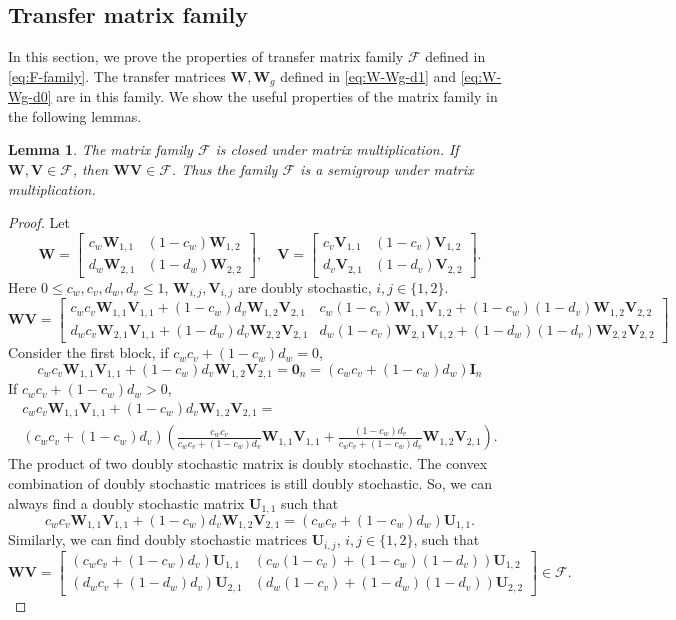 \documentclass{article}
\newcommand{\vzero}{\mathbf{0}}
\newcommand{\vI}{\mathbf{I}}
\newcommand{\vU}{\mathbf{U}}
\newcommand{\vV}{\mathbf{V}}
\newcommand{\vW}{\mathbf{W}}
\theoremstyle{plain}
\newtheorem{lemma}[theorem]{Lemma}
\theoremstyle{definition}
\begin{document}
\subsection{Transfer matrix family}
\label{append:trans-matrix-family}
In this section, we prove the properties of transfer matrix family $\mathscr{F}$ defined in \eqref{eq:F-family}.
The transfer matrices $\vW, \vW_g$ defined in \eqref{eq:W-Wg-d1} and \eqref{eq:W-Wg-d0} are in this family.
We show the useful properties of the matrix family in the following lemmas.
\begin{lemma}
\label{lem:F-semigroup}
The matrix family $\mathscr{F}$ is closed under matrix multiplication. If $\vW,\vV\in\mathscr{F}$, then $\vW\vV\in\mathscr{F}$. Thus the family $\mathscr{F}$ is a semigroup under matrix multiplication.
\end{lemma}
\begin{proof}
Let
$$
\vW=\left[
\begin{array}{cc}
    c_w \vW_{1,1} & (1-c_w)\vW_{1,2} \\
    d_w\vW_{2,1} & (1-d_w)\vW_{2,2} 
\end{array}
\right],\quad
\vV=\left[
\begin{array}{cc}
    c_v \vV_{1,1} & (1-c_v)\vV_{1,2} \\
    d_v\vV_{2,1} & (1-d_v)\vV_{2,2} 
\end{array}
\right].
$$
Here $0\leq c_w,c_v,d_w,d_v \leq 1$, $\vW_{i,j}, \vV_{i,j}$ are doubly stochastic, $i,j\in\{1,2\}$.
$$
\vW\vV=
\left[
\begin{array}{cc}
c_wc_v\vW_{1,1}\vV_{1,1}+(1-c_w)d_v\vW_{1,2}\vV_{2,1} &
c_w(1-c_v)\vW_{1,1}\vV_{1,2}+(1-c_w)(1-d_v)\vW_{1,2}\vV_{2,2}\\
d_wc_v\vW_{2,1}\vV_{1,1}+(1-d_w)d_v\vW_{2,2}\vV_{2,1} &
d_w(1-c_v)\vW_{2,1}\vV_{1,2}+(1-d_w)(1-d_v)\vW_{2,2}\vV_{2,2}
\end{array}
\right]
$$
Consider the first block, if $c_wc_v+(1-c_w)d_w=0$,
$$
c_wc_v\vW_{1,1}\vV_{1,1}+(1-c_w)d_v\vW_{1,2}\vV_{2,1}=\vzero_n=(c_wc_v+(1-c_w)d_w)\vI_n
$$
If $c_wc_v+(1-c_w)d_w>0$,
\begin{multline*}
c_wc_v\vW_{1,1}\vV_{1,1}+(1-c_w)d_v\vW_{1,2}\vV_{2,1}=\\
(c_wc_v+(1-c_w)d_v)\left(
\frac{c_wc_v}{c_wc_v+(1-c_w)d_v}\vW_{1,1}\vV_{1,1}+\frac{(1-c_w)d_v}{c_wc_v+(1-c_w)d_v}\vW_{1,2}\vV_{2,1}
\right).
\end{multline*}
The product of two doubly stochastic matrix is doubly stochastic. The convex combination of doubly stochastic matrices is still doubly stochastic. So, we can always find a doubly stochastic matrix $\vU_{1,1}$ such that 
$$
c_wc_v\vW_{1,1}\vV_{1,1}+(1-c_w)d_v\vW_{1,2}\vV_{2,1}=(c_wc_v+(1-c_w)d_w)\vU_{1,1}.
$$
Similarly, we can find doubly stochastic matrices $\vU_{i,j}$, $i,j\in\{1,2\}$, such that
$$
\vW\vV=
\left[
\begin{array}{cc}
(c_wc_v+(1-c_w)d_v)\vU_{1,1} &
(c_w(1-c_v)+(1-c_w)(1-d_v))\vU_{1,2}\\
(d_wc_v+(1-d_w)d_v)\vU_{2,1} &
(d_w(1-c_v)+(1-d_w)(1-d_v))\vU_{2,2}
\end{array}
\right]\in \mathscr{F}.
$$
\end{proof}
\end{document}
